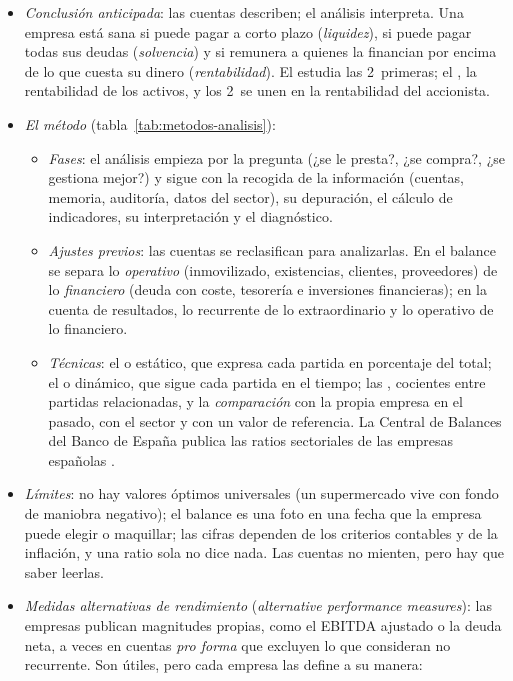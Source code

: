 \documentclass[11pt]{article}
\begin{document}
\begin{itemize}
\item \emph{Conclusión anticipada}: las cuentas describen; el análisis interpreta. Una empresa está sana si puede pagar a corto plazo (\emph{liquidez}), si puede pagar todas sus deudas (\emph{solvencia}) y si remunera a quienes la financian por encima de lo que cuesta su dinero (\emph{rentabilidad}). El  estudia las 2~primeras; el , la rentabilidad de los activos, y los 2~se unen en la rentabilidad del accionista.
\item \emph{El método} (tabla~\ref{tab:metodos-analisis}):
  \begin{itemize}
  \item \emph{Fases}: el análisis empieza por la pregunta (¿se le presta?, ¿se compra?, ¿se gestiona mejor?) y sigue con la recogida de la información (cuentas, memoria, auditoría, datos del sector), su depuración, el cálculo de indicadores, su interpretación y el diagnóstico.
  \item \emph{Ajustes previos}: las cuentas se reclasifican para analizarlas. En el balance se separa lo \emph{operativo} (inmovilizado, existencias, clientes, proveedores) de lo \emph{financiero} (deuda con coste, tesorería e inversiones financieras); en la cuenta de resultados, lo recurrente de lo extraordinario y lo operativo de lo financiero\nocite{Penman2013Financial}.
  \item \emph{Técnicas}: el  o estático, que expresa cada partida en porcentaje del total; el  o dinámico, que sigue cada partida en el tiempo; las , cocientes entre partidas relacionadas, y la \emph{comparación} con la propia empresa en el pasado, con el sector y con un valor de referencia. La Central de Balances del Banco de España publica las ratios sectoriales de las empresas españolas .
  \end{itemize}
\item \emph{Límites}: no hay valores óptimos universales (un supermercado vive con fondo de maniobra negativo); el balance es una foto en una fecha que la empresa puede elegir o maquillar; las cifras dependen de los criterios contables y de la inflación, y una ratio sola no dice nada. Las cuentas no mienten, pero hay que saber leerlas.
\item \emph{Medidas alternativas de rendimiento} (\emph{alternative performance measures}): las empresas publican magnitudes propias, como el EBITDA ajustado o la deuda neta, a veces en cuentas \emph{pro forma} que excluyen lo que consideran no recurrente. Son útiles, pero cada empresa las define a su manera:

\end{itemize}
\end{document}
